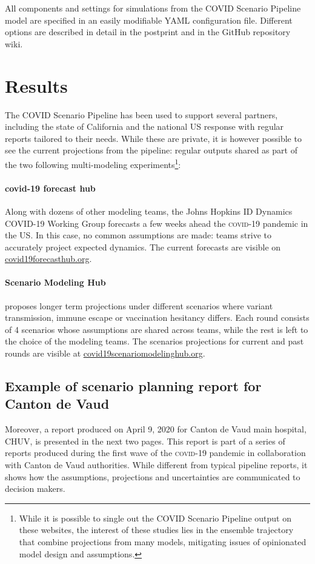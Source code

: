 All components and settings for simulations from the COVID  Scenario Pipeline model are specified in an easily modifiable YAML configuration file. Different options are described in detail in the postprint and in the GitHub repository wiki.

\section{Results}
The COVID Scenario Pipeline has been used to support several partners, including the state of California and the national US response with regular reports tailored to their needs. While these are private, it is however possible to see the current projections from the pipeline: regular outputs shared as part of the two following multi-modeling experiments\footnote{While it is possible to single out the COVID Scenario Pipeline output on these websites, the interest of these studies lies in the ensemble trajectory that combine projections from many models, mitigating issues of opinionated model design and assumptions.}:

\paragraph{covid-19 forecast hub} Along with dozens of other modeling teams, the Johns Hopkins ID Dynamics COVID-19 Working Group forecasts a few weeks ahead the \textsc{covid}-19 pandemic in the US. In this case, no common assumptions are made: teams strive to accurately project expected dynamics. The current forecasts are visible on \url{covid19forecasthub.org}\cite{Cramer:EvaluationIndividualEnsemble:2021}.

\paragraph{Scenario Modeling Hub} proposes longer term projections under different scenarios where \eg variant transmission, immune escape or vaccination hesitancy differs. Each round consists of 4 scenarios whose assumptions are shared across teams, while the rest is left to the choice of the modeling teams. The scenarios projections for current and past rounds are visible at \url{covid19scenariomodelinghub.org}\cite[][presents round 4 results.]{Borchering:ModelingFutureCOVID19:2021}.

\subsection{Example of scenario planning report for Canton de Vaud}
Moreover, a report produced on April 9, 2020 for Canton de Vaud main hospital, CHUV, is presented in the next two pages. This report is part of a series of reports produced during the first wave of the \textsc{covid}-19 pandemic in collaboration with Canton de Vaud authorities. While different from typical pipeline reports, it shows how the assumptions, projections and uncertainties are communicated to decision makers. 

